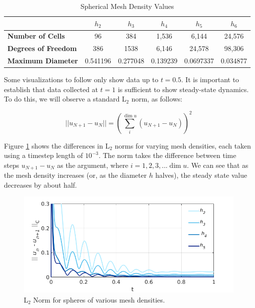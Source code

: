 \documentclass[12pt]{article}
\begin{document}
\begin{table}[H]
	\centering
	\caption{Spherical Mesh Density Values}\label{tab:refine}
	\begin{tabular}{|l|c|c|c|c|c|}
		\hline
		\textbf{}                   & $h_2$    & $h_3$    & $h_4$    & $h_5$     & $h_6$   \\ \hline
		\textbf{Number of Cells}    & 96       & 384      & 1,536    & 6,144     & 24,576\\ \hline
		\textbf{Degrees of Freedom} & 386      & 1538     & 6,146    & 24,578    & 98,306\\ \hline
		\textbf{Maximum Diameter}   & 0.541196 & 0.277048 & 0.139239 & 0.0697337 & 0.034877\\ \hline
	\end{tabular}
\end{table}

Some visualizations to follow only show data up to $t=0.5$. It is important to establish that data collected at $t=1$ is sufficient to show steady-state dynamics. To do this, we will observe a standard L$_2$ norm, as follows:

\begin{equation}\label{eq:norm_standard}
	||u_{N+1} - u_{N}|| = \left(\sum_i^{\dim{u}} (u_{N+1} - u_{N})\right)^2
\end{equation}

Figure \ref{fig:steady-state-h} shows the differences in L$_2$ norms for varying mesh densities, each taken using a timestep length of $10^{-3}$. The norm takes the difference between time steps $u_{N+1}-u_{N}$ as the argument, where $i=1,2,3,...\dim{u}$. We can see that as the mesh density increases (or, as the diameter $h$ halves), the steady state value decreases by about half.

\begin{figure}[H]
	\includegraphics[width=\linewidth]{images/norm_numeric.png}
	\caption{L$_2$ Norm for spheres of various mesh densities.}\label{fig:steady-state-h}
\end{figure}
\end{document}
